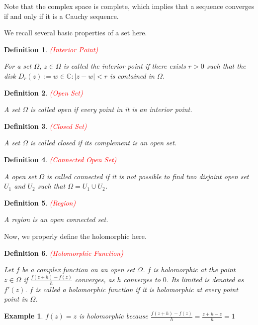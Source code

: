 \documentclass{article}
\newtheorem{definition}{Definition}
\newtheorem{example}{Example}
\begin{document}
Note that the complex space is complete, which implies that a sequence converges if and only if it is a Cauchy sequence.

We recall several basic properties of a set here.

\begin{definition}\textcolor{red}{(Interior Point)}

For a set $\Omega$, $z\in\Omega$ is called the interior point if there exists $r>0$ such that the disk $D_r(z):={w\in\mathbb{C}:|z-w|<r}$ is contained in $\Omega$.
\end{definition}

\begin{definition}\textcolor{red}{(Open Set)}

A set $\Omega$ is called open if every point in it is an interior point.
\end{definition}

\begin{definition}\textcolor{red}{(Closed Set)}

A set $\Omega$ is called closed if its complement is an open set.
\end{definition}

\begin{definition}\textcolor{red}{(Connected Open Set)}

A open set $\Omega$ is called connected if it is not possible to find two disjoint open set $U_1$ and $U_2$ such that $\Omega=U_1\cup U_2$.
\end{definition}

\begin{definition}\textcolor{red}{(Region)}

A region is an open connected set.
\end{definition}

Now, we properly define the holomorphic here. 

\begin{definition} \label{def:holomorphic} \textcolor{red}{(Holomorphic Function)}

Let $f$ be a complex function on an open set $\Omega$. $f$ is holomorphic at the point $z\in\Omega$ if $\frac{f(z+h)-f(z)}{h}$ converges, as $h$ converges to $0$. Its limited is denoted as $f'(z)$. $f$ is called a holomorphic function if it is holomorphic at every point point in $\Omega$. 
\end{definition}

\begin{example}
$f(z)=z$ is holomorphic because $\frac{f(z+h)-f(z)}{h}=\frac{z+h-z}{h}=1$
\end{example}
\end{document}
